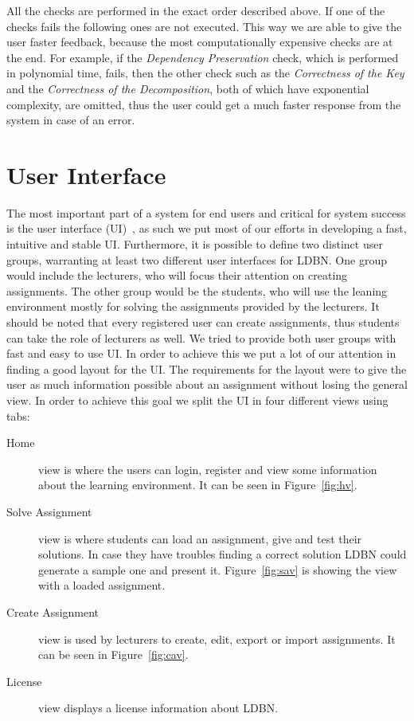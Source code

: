 All the checks are performed in the exact order described above. If one of the checks fails the following ones
are not executed. This way we are able to give the user faster feedback, because 
the most computationally expensive checks are at the end. For example, if the \textit{Dependency Preservation}
check, which is performed in polynomial time, fails, then the other check such as the 
\textit{Correctness of the Key} and the \textit{Correctness of the Decomposition}, both of which 
have exponential complexity, are omitted, thus the user could get a much faster response from the system
in case of an error. 

\section{User Interface}
The most important part of a system for end users and critical for system 
success is the user interface (UI)~\cite{p9}, as such we put most of
our efforts in developing a fast, intuitive and stable UI. Furthermore,
it is possible to define two distinct user groups, warranting at least two different
user interfaces for LDBN.  One group would include the lecturers, who will
focus their attention on creating assignments. The other group would be the 
students, who will use the leaning environment mostly for solving 
the assignments provided by the lecturers. It should be noted that every registered
user can create assignments, thus students can take the role of lecturers as well.
We tried to provide both 
user groups with fast and easy to use UI. In order to achieve this we put a lot
of our attention in finding a good layout for the UI. The requirements for
the layout were to give the user as much information possible about an 
assignment without losing the general view. In order to achieve this goal  
we split the UI in four different views using tabs:

\begin{description}
	\item[Home] view is where the users can login, register and view some information 
	about the learning environment. It can be seen in Figure~\ref{fig:hv}.
	\item[Solve Assignment] view is where students can load an assignment, give and
	test their solutions. In case they have troubles finding a correct solution
	LDBN could generate a sample one and present it. Figure~\ref{fig:sav} is showing
	the view with a loaded assignment.
	\item[Create Assignment] view is used by lecturers to create, edit, export or import
	assignments. It can be seen in Figure~\ref{fig:cav}.
	\item[License] view displays a license information about LDBN.
\end{description} 


